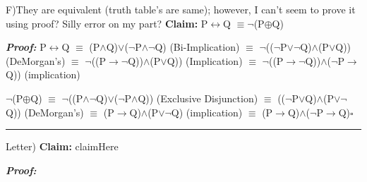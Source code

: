 \documentclass{article}
\begin{document}
F)They are equivalent (truth table's are same); however, I can't seem to prove it using proof? Silly error on my part? \newline \textbf{Claim: } P$\leftrightarrow$Q $\equiv$$\neg$(P$\oplus$Q)\newline

\textbf{\textit{Proof: }}\newline
P$\leftrightarrow$Q $\equiv$ (P$\wedge$Q)$\lor$($\neg$P$\wedge$$\neg$Q) (Bi-Implication)\newline
$\equiv$ $\neg$(($\neg$P$\lor$$\neg$Q)$\wedge$(P$\lor$Q)) (DeMorgan's)\newline
$\equiv$ $\neg$((P$\rightarrow$$\neg$Q))$\wedge$(P$\lor$Q)) (Implication)\newline
$\equiv$ $\neg$((P$\rightarrow$$\neg$Q))$\wedge$($\neg$P$\rightarrow$Q)) (implication)\newline\newline

$\neg$(P$\oplus$Q) $\equiv$ $\neg$((P$\wedge$$\neg$Q)$\lor$($\neg$P$\wedge$Q)) (Exclusive Disjunction)\newline
$\equiv$ (($\neg$P$\lor$Q)$\wedge$(P$\lor$$\neg$Q)) (DeMorgan's) \newline
$\equiv$ (P$\rightarrow$Q)$\wedge$(P$\lor$$\neg$Q) (implication)\newline
$\equiv$ (P$\rightarrow$Q)$\wedge$($\neg$P$\rightarrow$Q)$\square$\newline\rule{10cm}{1pt}\newline


\enddocument





Letter) \textbf{Claim: } claimHere\newline

\textbf{\textit{Proof: }}\newline
\end{document}
